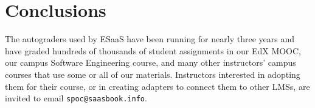 \section{Conclusions}

The autograders used by ESaaS have been running for nearly three years
and have graded hundreds of thousands of student assignments in our EdX
MOOC, our campus Software Engineering course, and many other
instructors' campus courses that use some or all of our materials.
Instructors interested in adopting them for their course, or in
creating adapters to connect them to other LMSs, are invited to
email \texttt{spoc@saasbook.info}.


